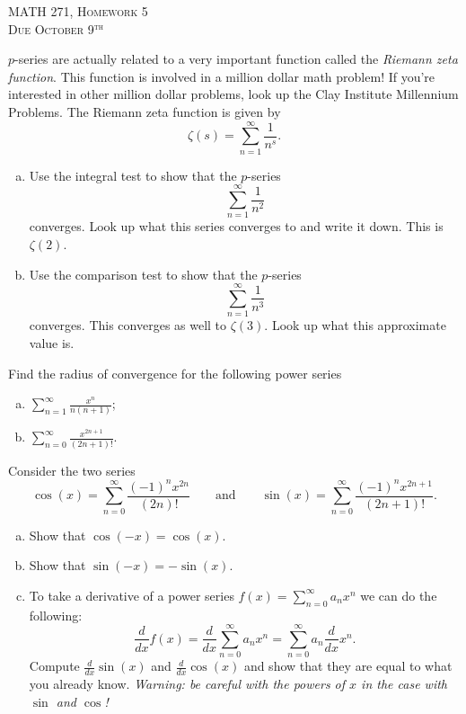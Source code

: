 \documentclass[12pt]{article} %
\begin{document}
\begin{center}
   \textsc{\large MATH 271, Homework 5}\\
   \textsc{Due October 9$^\textrm{th}$}
\end{center}
\vspace{.5cm}


\begin{problem} $p$-series are actually related to a very important function called the \emph{Riemann zeta function}.  This function is involved in a million dollar math problem! If you're interested in other million dollar problems, look up the Clay Institute Millennium Problems. The Riemann zeta function is given by
\[
\zeta (s) = \sum_{n=1}^\infty \frac{1}{n^s}.
\]
\begin{enumerate}[(a)]
    \item Use the integral test to show that the $p$-series
    \[
    \sum_{n=1}^\infty \frac{1}{n^2}
    \]
    converges.  Look up what this series converges to and write it down. This is $\zeta(2)$.
    \item Use the comparison test to show that the $p$-series
    \[
    \sum_{n=1}^\infty \frac{1}{n^3}
    \]
    converges. This converges as well to $\zeta(3)$. Look up what this approximate value is.
\end{enumerate}
\end{problem}

\begin{problem}
Find the radius of convergence for the following power series
\begin{enumerate}[(a)]
    \item $\displaystyle{\sum_{n=1}^\infty \frac{x^n}{n(n+1)}}$;
    \item $\displaystyle{\sum_{n=0}^\infty \frac{x^{2n+1}}{(2n+1)!}}$.
\end{enumerate}
\end{problem}

\begin{problem}
Consider the two series
\[
\cos(x) = \sum_{n=0}^\infty \frac{(-1)^n x^{2n}}{(2n)!} \qquad \textrm{and} \qquad \sin(x) = \sum_{n=0}^\infty \frac{(-1)^n x^{2n+1}}{(2n+1)!}.
\]
\begin{enumerate}[(a)]
    \item Show that $\cos(-x)=\cos(x)$.
    \item Show that $\sin(-x)=-\sin(x)$.
    \item To take a derivative of a power series $f(x) = \displaystyle{\sum_{n=0}^\infty a_n x^n}$ we can do the following: 
    \[
    \frac{d}{dx}f(x) = \frac{d}{dx} \sum_{n=0}^\infty a_n x^n = \sum_{n=0}^\infty a_n \frac{d}{dx} x^n.
    \]
    Compute $\frac{d}{dx} \sin(x)$ and $\frac{d}{dx} \cos(x)$ and show that they are equal to what you already know. \emph{Warning: be careful with the powers of $x$ in the case with $\sin$ and $\cos$!}
\end{enumerate}
\end{problem}
\end{document}
